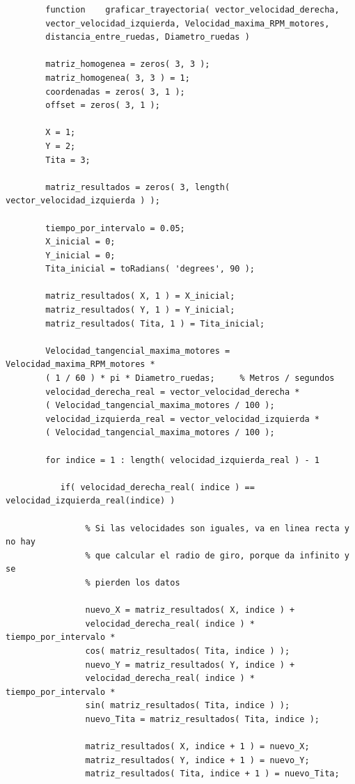 \documentclass[12pt,a4paper]{article}
\begin{document}
        \begin{verbatim}
        function    graficar_trayectoria( vector_velocidad_derecha,
        vector_velocidad_izquierda, Velocidad_maxima_RPM_motores,
        distancia_entre_ruedas, Diametro_ruedas )
        
        matriz_homogenea = zeros( 3, 3 );
        matriz_homogenea( 3, 3 ) = 1;
        coordenadas = zeros( 3, 1 );
        offset = zeros( 3, 1 );
        
        X = 1;
        Y = 2;
        Tita = 3;
        
        matriz_resultados = zeros( 3, length( vector_velocidad_izquierda ) );

        tiempo_por_intervalo = 0.05;
        X_inicial = 0;
        Y_inicial = 0;
        Tita_inicial = toRadians( 'degrees', 90 );

        matriz_resultados( X, 1 ) = X_inicial;
        matriz_resultados( Y, 1 ) = Y_inicial;
        matriz_resultados( Tita, 1 ) = Tita_inicial;

        Velocidad_tangencial_maxima_motores = Velocidad_maxima_RPM_motores *
        ( 1 / 60 ) * pi * Diametro_ruedas;     % Metros / segundos
        velocidad_derecha_real = vector_velocidad_derecha *
        ( Velocidad_tangencial_maxima_motores / 100 );
        velocidad_izquierda_real = vector_velocidad_izquierda *
        ( Velocidad_tangencial_maxima_motores / 100 );
    
        for indice = 1 : length( velocidad_izquierda_real ) - 1

           if( velocidad_derecha_real( indice ) == velocidad_izquierda_real(indice) )

                % Si las velocidades son iguales, va en linea recta y no hay
                % que calcular el radio de giro, porque da infinito y se
                % pierden los datos

                nuevo_X = matriz_resultados( X, indice ) +
                velocidad_derecha_real( indice ) * tiempo_por_intervalo *
                cos( matriz_resultados( Tita, indice ) );
                nuevo_Y = matriz_resultados( Y, indice ) +
                velocidad_derecha_real( indice ) * tiempo_por_intervalo *
                sin( matriz_resultados( Tita, indice ) );
                nuevo_Tita = matriz_resultados( Tita, indice );

                matriz_resultados( X, indice + 1 ) = nuevo_X;
                matriz_resultados( Y, indice + 1 ) = nuevo_Y;
                matriz_resultados( Tita, indice + 1 ) = nuevo_Tita;


\end{verbatim}
\end{document}
